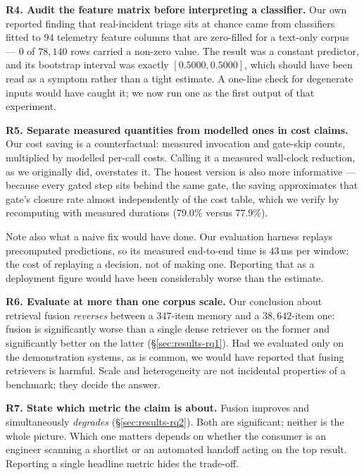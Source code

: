 \smallskip
\noindent\textbf{R4. Audit the feature matrix before interpreting a
classifier.} Our own reported finding that real-incident triage sits at chance
came from classifiers fitted to $94$ telemetry feature columns that are
zero-filled for a text-only corpus --- $0$ of $78{,}140$ rows carried a
non-zero value. The result was a constant predictor, and its bootstrap interval
was exactly $[0.5000, 0.5000]$, which should have been read as a symptom rather
than a tight estimate. A one-line check for degenerate inputs would have caught
it; we now run one as the first output of that experiment.

\smallskip
\noindent\textbf{R5. Separate measured quantities from modelled ones in cost
claims.} Our cost saving is a counterfactual: measured invocation and
gate-skip counts, multiplied by modelled per-call costs. Calling it a measured
wall-clock reduction, as we originally did, overstates it. The honest version is
also more informative --- because every gated step sits behind the same gate,
the saving approximates that gate's closure rate almost independently of the
cost table, which we verify by recomputing with measured durations
($79.0\%$ versus $77.9\%$).

Note also what a naive fix would have done. Our evaluation harness replays
precomputed predictions, so its measured end-to-end time is $43$\,ms per
window: the cost of replaying a decision, not of making one. Reporting that as
a deployment figure would have been considerably worse than the estimate.

\smallskip
\noindent\textbf{R6. Evaluate at more than one corpus scale.} Our conclusion
about retrieval fusion \emph{reverses} between a $347$-item memory and a
$38{,}642$-item one: fusion is significantly worse than a single dense retriever
on the former and significantly better on the latter
(\S\ref{sec:results-rq1}). Had we evaluated only on the demonstration systems,
as is common, we would have reported that fusing retrievers is harmful. Scale
and heterogeneity are not incidental properties of a benchmark; they decide the
answer.

\smallskip
\noindent\textbf{R7. State which metric the claim is about.} Fusion improves
 and simultaneously \emph{degrades} 
(\S\ref{sec:results-rq2}). Both are significant; neither is the whole picture.
Which one matters depends on whether the consumer is an engineer scanning a
shortlist or an automated handoff acting on the top result. Reporting a single
headline metric hides the trade-off.
